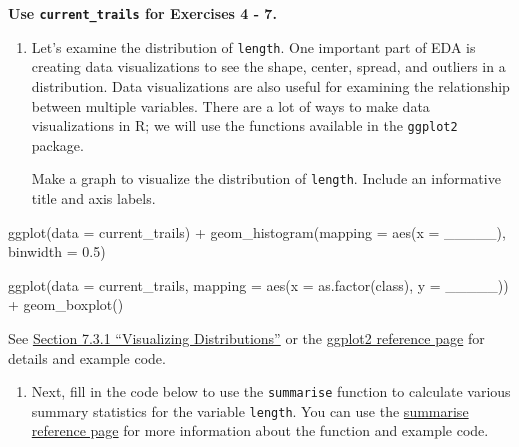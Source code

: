 \documentclass[
]{article}
\newenvironment{Shaded}{\begin{snugshade}}{\end{snugshade}}
\newcommand{\AttributeTok}[1]{\textcolor[rgb]{0.77,0.63,0.00}{#1}}
\newcommand{\FloatTok}[1]{\textcolor[rgb]{0.00,0.00,0.81}{#1}}
\newcommand{\FunctionTok}[1]{\textcolor[rgb]{0.00,0.00,0.00}{#1}}
\newcommand{\NormalTok}[1]{#1}
\newcommand{\SpecialCharTok}[1]{\textcolor[rgb]{0.00,0.00,0.00}{#1}}
\providecommand{\tightlist}{%
  \setlength{\itemsep}{0pt}\setlength{\parskip}{0pt}}
\begin{document}
\textbf{Use \texttt{current\_trails} for Exercises 4 - 7.}

\begin{enumerate}
\def\labelenumi{\arabic{enumi}.}
\setcounter{enumi}{3}
\item
  Let's examine the distribution of \texttt{length}. One important part
  of EDA is creating data visualizations to see the shape, center,
  spread, and outliers in a distribution. Data visualizations are also
  useful for examining the relationship between multiple variables.
  There are a lot of ways to make data visualizations in R; we will use
  the functions available in the \texttt{ggplot2} package.

  Make a graph to visualize the distribution of \texttt{length}. Include
  an informative title and axis labels.
\end{enumerate}

\begin{Shaded}
\begin{Highlighting}[]
\FunctionTok{ggplot}\NormalTok{(}\AttributeTok{data =}\NormalTok{ current\_trails) }\SpecialCharTok{+}
  \FunctionTok{geom\_histogram}\NormalTok{(}\AttributeTok{mapping =} \FunctionTok{aes}\NormalTok{(}\AttributeTok{x =}\NormalTok{ \_\_\_\_\_), }\AttributeTok{binwidth =} \FloatTok{0.5}\NormalTok{)}

\FunctionTok{ggplot}\NormalTok{(}\AttributeTok{data =}\NormalTok{ current\_trails, }\AttributeTok{mapping =} \FunctionTok{aes}\NormalTok{(}\AttributeTok{x =} \FunctionTok{as.factor}\NormalTok{(class), }\AttributeTok{y =}\NormalTok{ \_\_\_\_\_)) }\SpecialCharTok{+}
  \FunctionTok{geom\_boxplot}\NormalTok{()}
\end{Highlighting}
\end{Shaded}

See
\href{https://r4ds.had.co.nz/exploratory-data-analysis.html\#introduction-3}{Section
7.3.1 ``Visualizing Distributions''} or the
\href{https://ggplot2.tidyverse.org/reference/index.html}{ggplot2
reference page} for details and example code.

\begin{enumerate}
\def\labelenumi{\arabic{enumi}.}
\setcounter{enumi}{4}
\tightlist
\item
  Next, fill in the code below to use the \texttt{summarise} function to
  calculate various summary statistics for the variable \texttt{length}.
  You can use the
  \href{https://dplyr.tidyverse.org/reference/summarise.html}{summarise
  reference page} for more information about the function and example
  code.
\end{enumerate}
\end{document}
